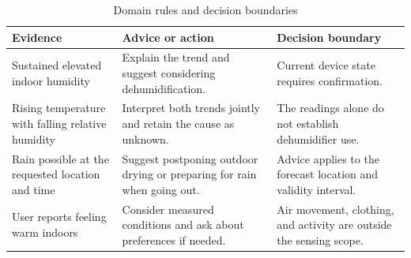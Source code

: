 \begin{table}[t]
\caption{Domain rules and decision boundaries}
\label{tab:domain-rules}
\centering\footnotesize
\begin{tabular}{@{}p{}p{}p{}@{}}
\hline
Evidence & Advice or action & Decision boundary \\
\hline
Sustained elevated indoor humidity & Explain the trend and suggest considering dehumidification. & Current device state requires confirmation. \\
Rising temperature with falling relative humidity & Interpret both trends jointly and retain the cause as unknown. & The readings alone do not establish dehumidifier use. \\
Rain possible at the requested location and time & Suggest postponing outdoor drying or preparing for rain when going out. & Advice applies to the forecast location and validity interval. \\
User reports feeling warm indoors & Consider measured conditions and ask about preferences if needed. & Air movement, clothing, and activity are outside the sensing scope. \\
\hline
\end{tabular}
\end{table}
